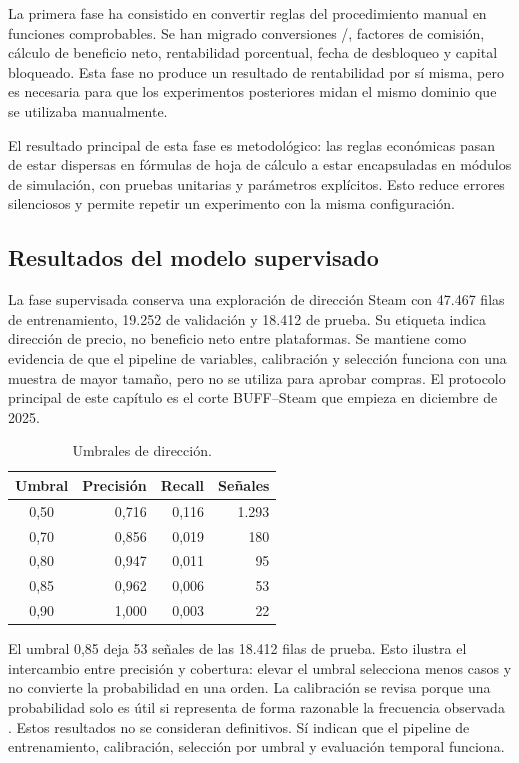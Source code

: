 La primera fase ha consistido en convertir reglas del procedimiento manual en funciones comprobables. Se han migrado conversiones /, factores de comisión, cálculo de beneficio neto, rentabilidad porcentual, fecha de desbloqueo y capital bloqueado. Esta fase no produce un resultado de rentabilidad por sí misma, pero es necesaria para que los experimentos posteriores midan el mismo dominio que se utilizaba manualmente.

El resultado principal de esta fase es metodológico: las reglas económicas pasan de estar dispersas en fórmulas de hoja de cálculo a estar encapsuladas en módulos de simulación, con pruebas unitarias y parámetros explícitos. Esto reduce errores silenciosos y permite repetir un experimento con la misma configuración.

\subsection{Resultados del modelo supervisado}

La fase supervisada conserva una exploración de dirección Steam con 47.467 filas de entrenamiento, 19.252 de validación y 18.412 de prueba. Su etiqueta indica dirección de precio, no beneficio neto entre plataformas. Se mantiene como evidencia de que el pipeline de variables, calibración y selección funciona con una muestra de mayor tamaño, pero no se utiliza para aprobar compras. El protocolo principal de este capítulo es el corte BUFF--Steam que empieza en diciembre de 2025.

\begin{table}[h]
\centering
\begin{tabular}{c r r r}
\toprule
Umbral & Precisión & Recall & Señales \\
\midrule
0,50 & 0,716 & 0,116 & 1.293 \\
0,70 & 0,856 & 0,019 & 180 \\
0,80 & 0,947 & 0,011 & 95 \\
0,85 & 0,962 & 0,006 & 53 \\
0,90 & 1,000 & 0,003 & 22 \\
\bottomrule
\end{tabular}
\caption{Umbrales de dirección.}
\end{table}

El umbral 0,85 deja 53 señales de las 18.412 filas de prueba. Esto ilustra el intercambio entre precisión y cobertura: elevar el umbral selecciona menos casos y no convierte la probabilidad en una orden. La calibración se revisa porque una probabilidad solo es útil si representa de forma razonable la frecuencia observada \cite{niculescu2005predicting,guo2017calibration}. Estos resultados no se consideran definitivos. Sí indican que el pipeline de entrenamiento, calibración, selección por umbral y evaluación temporal funciona.

